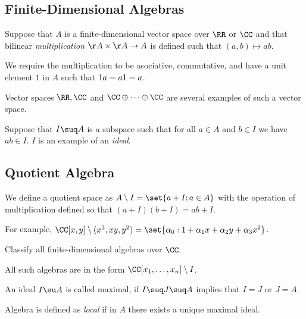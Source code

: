\documentclass[11pt]{scrartcl}
\begin{document}
  \subsection{Finite-Dimensional Algebras}

  Suppose that $A$ is a finite-dimensional vector space over $\RR$ or $\CC$ and that
  bilinear \textit{multiplication} $\AA \times \AA \to A$ is defined
  such that $(a, b)\mapsto ab$.

  We require the multiplication to be asociative, commutative, and
  have a unit element $1$ in $A$ such that $1\*a = a\* 1 = a$.

  Vector spaces $\RR, \CC$ and $\CC\oplus \dots \oplus \CC$ are
  several examples of such a vector space.

  Suppose that $I\suq A$ is a subspace such that for all $a\in A$ and
  $b\in I$ we have $ab \in I$. $I$ is an example of an \textit{ideal}.

  \subsection{Quotient Algebra}

  We define a quotient space as $A\setminus I = \set{a+I; a\in A}$
  with the operation of multiplication defined so that
  $(a+I)(b+I) = ab+I$.

  For example,
  $\CC[x, y]\setminus (x^{3}, xy, y^{2}) =
  \set{\alpha_{0}:1+\alpha_{1}x+\alpha_{2}y + \alpha_{3}x^{2}}$.

  \begin{problem*}
    \hfill

    Classify all finite-dimensional algebras over $\CC$.
  \end{problem*}

  \begin{example}

    All such algebras are in the form $\CC[x_{1}, \dots, x_{n}]\setminus I$.

  \end{example}

  \begin{definition}
    An ideal $I \su A$ is called maximal, if $I\suq J \suq A$ implies
    that $I = J$ or $J = A$.
  \end{definition}

  \begin{definition}
    Algebra is defined as \textit{local} if in $A$ there exists a
    unique maximal ideal.
  \end{definition}
\end{document}
